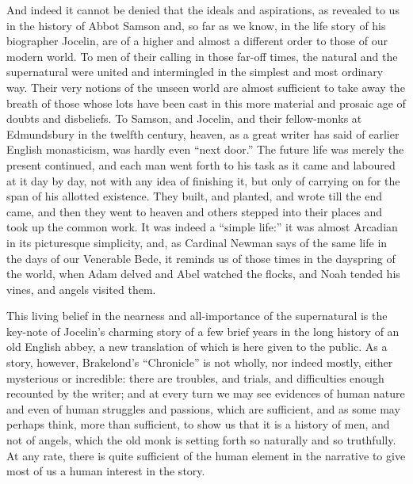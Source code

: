 \documentclass[10pt]{book}
\begin{document}
{{And indeed it cannot be denied that the ideals and aspirations, as revealed to us in the history of Abbot Samson and, so far as we know, in the life story of his biographer Jocelin, are of a higher and almost a different order to those of our modern world. To men of their calling in those far-off times, the natural and the supernatural were united and intermingled in the simplest and most ordinary way. Their very notions of the unseen world are almost sufficient to take away the breath of those whose lots have been cast in this more material and prosaic age of doubts and disbeliefs. To Samson, and Jocelin, and their fellow-monks at Edmundsbury in the twelfth century, heaven, as a great writer has said of earlier English monasticism, was hardly even ``next door.'' The future life was merely the present continued, and each man went forth to his task as it came and laboured at it day by day, not with any idea of finishing it, but only of carrying on for the span of his allotted existence. They built, and planted, and wrote till the end came, and then they went to heaven and others stepped into their places and took up the common work. It was indeed a ``simple life:'' it was almost Arcadian in its picturesque simplicity, and, as Cardinal Newman says of the same life in the days of our Venerable Bede, it reminds us of those times in the dayspring of the world, when Adam delved and Abel watched the flocks, and Noah tended his vines, and angels visited them.

This living belief in the nearness and all-importance of the supernatural is the key-note of Jocelin's charming story of a few brief years in the long history of an old English abbey, a new translation of which is here given to the public. As a story, however, Brakelond's ``Chronicle'' is not wholly, nor indeed mostly, either mysterious or incredible: there are troubles, and trials, and difficulties enough recounted by the writer; and at every turn we may see evidences of human nature and even of human struggles and passions, which are sufficient, and as some may perhaps think, more than sufficient, to show us that it is a history of men, and not of angels, which the old monk is setting forth so naturally and so truthfully. At any rate, there is quite sufficient of the human element in the narrative to give most of us a human interest in the story.

}}
\end{document}
